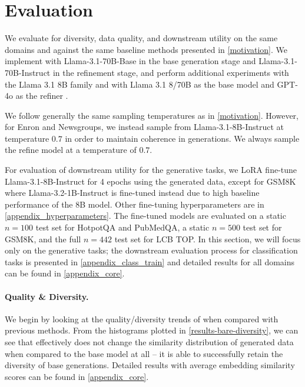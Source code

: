 \section{Evaluation}
\label{results}

We evaluate \Sys{} for diversity, data quality, and downstream utility on the same domains and against the same baseline methods presented in \cref{motivation}. We implement \Sys{} with Llama-3.1-70B-Base in the base generation stage and Llama-3.1-70B-Instruct in the refinement stage, and perform additional experiments with the Llama 3.1 8B family and with Llama 3.1 8/70B as the base model and GPT-4o as the refiner \cite{llama2024llama, openai2024hello}.

We follow generally the same sampling temperatures as in \cref{motivation}. However, for Enron and Newsgroups, we instead sample from Llama-3.1-8B-Instruct at temperature $0.7$ in order to maintain coherence in generations. We always sample the refine model at a temperature of $0.7$.

For evaluation of downstream utility for the generative tasks, we LoRA \cite{hu2021lora} fine-tune Llama-3.1-8B-Instruct for 4 epochs using the generated data, except for GSM8K where Llama-3.2-1B-Instruct \cite{llama2024llama} is fine-tuned instead due to high baseline performance of the 8B model. Other fine-tuning hyperparameters are in \cref{appendix_hyperparameters}. The fine-tuned models are evaluated on a static $n=100$ test set for HotpotQA and PubMedQA, a static $n=500$ test set for GSM8K, and the full $n=442$ test set for LCB TOP. In this section, we will focus only on the generative tasks; the downstream evaluation process for classification tasks is presented in \cref{appendix_class_train} and detailed results for all domains can be found in \cref{appendix_core}.



\paragraph{\Sys{} Quality \& Diversity.} We begin by looking at the quality/diversity trends of \Sys{} when compared with previous methods. From the histograms plotted in \cref{results-bare-diversity}, we can see that \Sys{} effectively does not change the similarity distribution of generated data when compared to the base model at all -- it is able to successfully retain the diversity of base generations. Detailed results with average embedding similarity scores can be found in \cref{appendix_core}.


